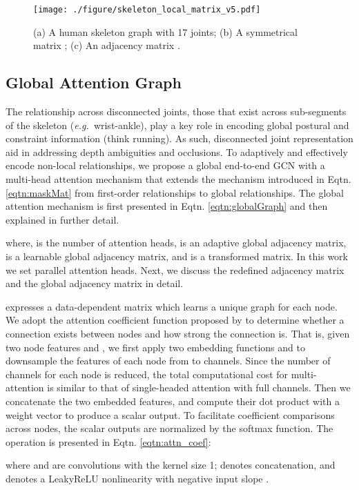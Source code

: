 \documentclass[letterpaper, 10 pt, conference, twoside]{ieeeconf}
\newcommand{\eg}{{\em e.g.\ }}
\begin{document}
\begin{figure}[ht]
	\centering
	\texttt{[image: ./figure/skeleton\_local\_matrix\_v5.pdf]}
	\caption{(a) A human skeleton graph with 17 joints; (b) A symmetrical matrix ; (c) An adjacency matrix .}
	\label{fig:ske_local_mat}
\end{figure}
\subsection{Global Attention Graph}\label{subsec:globalGCNs}
The relationship across disconnected joints, those that exist across sub-segments of the skeleton (\eg wrist-ankle), play a key role in encoding global postural and constraint information (think running). As such, disconnected joint representation aid in addressing depth ambiguities and occlusions. To adaptively and effectively encode non-local relationships, we propose a global end-to-end GCN with a multi-head attention mechanism that extends the mechanism introduced in Eqtn. \ref{eqtn:maskMat} from first-order relationships to global relationships. The global attention mechanism is first presented in Eqtn. \ref{eqtn:globalGraph} and then explained in further detail.

\noindent where,  is the number of attention heads,  is an adaptive global adjacency matrix,  is a learnable global adjacency matrix, and  is a transformed matrix. In this work we set  parallel attention heads. Next, we discuss the redefined adjacency matrix  and the global adjacency matrix  in detail.


\textbf{} expresses a data-dependent matrix which learns a unique graph for each node. We adopt the attention coefficient function proposed by \cite{velivckovic2017graph} to determine whether a connection exists between nodes and how strong the connection is. That is, given two node features  and , we first apply two embedding functions  and  to downsample the features of each node from  to  channels. Since the number of channels for each node is reduced, the total computational cost for multi-attention is similar to that of single-headed attention with full channels. Then we concatenate the two embedded features, and compute their dot product with a weight vector  to produce a scalar output. To facilitate coefficient comparisons across nodes, the scalar outputs are normalized by the softmax function. The operation is presented in Eqtn. \ref{eqtn:attn_coef}:

where  and  are convolutions with the kernel size 1;  denotes concatenation, and  denotes a LeakyReLU nonlinearity with negative input slope .
\end{document}
